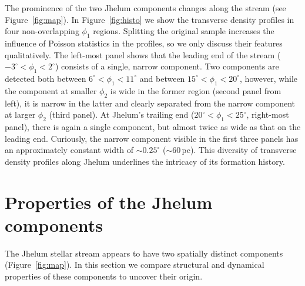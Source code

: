 \documentclass[twocolumn]{aastex62}
\begin{document}
The prominence of the two Jhelum components changes along the stream (see Figure~\ref{fig:map}).
In Figure~\ref{fig:histo} we show the transverse density profiles in four non-overlapping $\phi_1$ regions.
Splitting the original sample increases the influence of Poisson statistics in the profiles, so we only discuss their features qualitatively.
The left-most panel shows that the leading end of the stream ($-3^\circ<\phi_1<2^\circ$) consists of a single, narrow component.
Two components are detected both between $6^\circ<\phi_1<11^\circ$ and between $15^\circ<\phi_1<20^\circ$, however, while the component at smaller $\phi_2$ is wide in the former region (second panel from left), it is narrow in the latter and clearly separated from the narrow component at larger $\phi_2$ (third panel).
At Jhelum's trailing end ($20^\circ<\phi_1<25^\circ$, right-most panel), there is again a single component, but almost twice as wide as that on the leading end.
Curiously, the narrow component visible in the first three panels has an approximately constant width of $\sim0.25^\circ$ ($\sim60\,$pc).
This diversity of transverse density profiles along Jhelum underlines the intricacy of its formation history.

\section{Properties of the Jhelum components}
\label{sec:origin}
The Jhelum stellar stream appears to have two spatially distinct components (Figure~\ref{fig:map}).
In this section we compare structural and dynamical properties of these components to uncover their origin.

\end{document}
